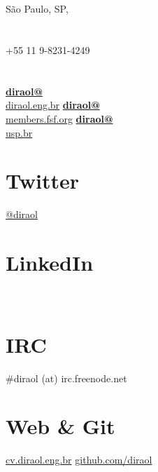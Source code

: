 \documentclass[]{friggeri-cv}
\begin{document}
\thispagestyle{empty}
%
%

%
%
\begin{aside}
  \section{}
    São Paulo, SP, 
    ~
  \section{}
    +55 11 9-8231-4249
    ~
  \section{}
    \href{mailto:diraol@diraol.eng.br}{\textbf{diraol@}\\diraol.eng.br}
    \href{mailto:diraol@members.fsf.org}{\textbf{diraol@}\\members.fsf.org}
    \href{mailto:diraol@usp.br}{\textbf{diraol@}\\usp.br}
    ~
  \section{Twitter}
    \href{http://twitter.com/diraol}{@diraol}
    ~
  \section{LinkedIn}
    ~
  \section{IRC}
    \#diraol (at) irc.freenode.net
    ~
  \section{Web \& Git}
    \href{http://cv.diraol.eng.br}{cv.diraol.eng.br}
    \href{https://github.com/diraol}{github.com/diraol}
    ~

\end{aside}
\end{document}
